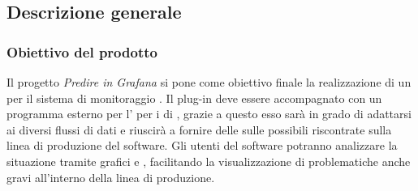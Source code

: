 \documentclass[../analisi-dei-requisiti.tex]{subfiles}
\begin{document}
\subsection{Descrizione generale}%
\label{sub:informazioni_generale}

\subsubsection{Obiettivo del prodotto}
\label{subs:obiettivo_del_prodotto}
	Il progetto \emph{Predire in Grafana} si pone come obiettivo finale la realizzazione di un  per il sistema di monitoraggio . Il plug-in deve essere accompagnato con un programma esterno per l'  per i  di , grazie a questo esso sarà in grado di adattarsi ai diversi flussi di dati e riuscirà a fornire delle  sulle possibili  riscontrate sulla linea di produzione del software. Gli utenti del software potranno analizzare la situazione tramite grafici e , facilitando la visualizzazione di problematiche anche gravi all'interno della linea di produzione.
\end{document}
